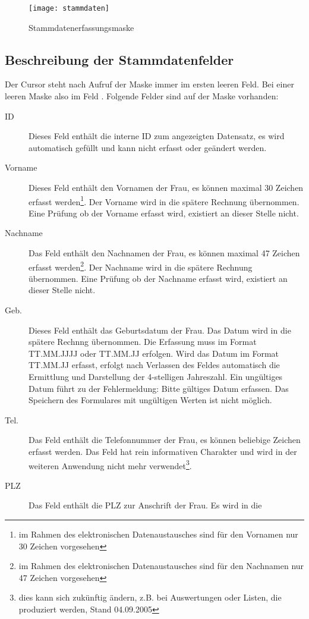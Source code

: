 \begin{figure}[ht]
\centering
\texttt{[image: stammdaten]}
\caption{Stammdatenerfassungsmaske\label{stammdatenerfassung:fig}}
\end{figure}

\subsection{Beschreibung der Stammdatenfelder}
Der Cursor steht nach Aufruf der Maske immer im ersten leeren  Feld.
Bei einer leeren Maske also im Feld .
Folgende Felder sind auf der Maske vorhanden:
\begin{description}
\item[ID] Dieses Feld enthält die interne ID zum angezeigten Datensatz,
es wird automatisch gefüllt und kann nicht erfasst oder geändert werden.
\item[Vorname] Dieses Feld enthält den Vornamen der Frau, es können maximal 30 Zeichen erfasst werden\footnote{im Rahmen des elektronischen Datenaustausches sind für den Vornamen nur 30 Zeichen vorgesehen}. Der Vorname wird in die spätere Rechnung übernommen.
Eine Prüfung ob der Vorname erfasst wird, existiert an dieser Stelle nicht.
\item[Nachname] Das Feld enthält den Nachnamen der Frau, es können maximal 47 Zeichen erfasst werden\footnote{im Rahmen des elektronischen Datenaustausches sind für den Nachnamen nur 47 Zeichen vorgesehen}. Der Nachname wird in die spätere Rechnung übernommen.
Eine Prüfung ob der Nachname erfasst wird, existiert an dieser Stelle nicht.
\item[Geb.] Dieses Feld enthält das Geburtsdatum der Frau. Das Datum wird
in die spätere Rechnng übernommen. Die Erfassung muss
im Format TT.MM.JJJJ oder TT.MM.JJ erfolgen. 
Wird das Datum im Format TT.MM.JJ erfasst, erfolgt nach Verlassen des
Feldes automatisch die Ermittlung und Darstellung der 4-stelligen Jahreszahl.
Ein ungültiges Datum führt zu der Fehlermeldung: Bitte gültiges Datum erfassen.
Das Speichern des Formulares mit ungültigen Werten ist nicht möglich.
\item[Tel.] Das Feld enthält die Telefonnummer der Frau, es können beliebige
Zeichen erfasst werden. Das Feld hat rein informativen Charakter 
und wird in der weiteren Anwendung
nicht mehr verwendet\footnote{dies kann sich zukünftig ändern, z.B. bei
Auswertungen oder Listen, die produziert werden, Stand 04.09.2005}.
\item[PLZ] Das Feld enthält die PLZ zur Anschrift der Frau. Es wird in die 

\end{description}
